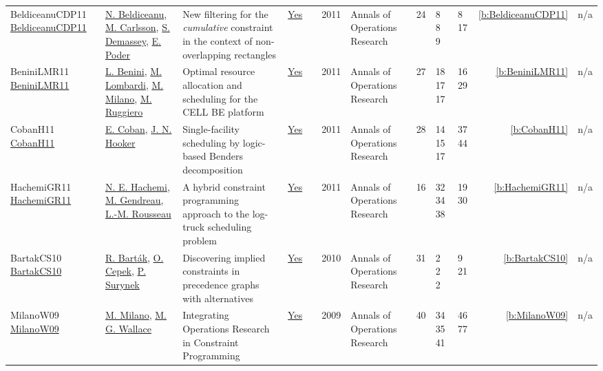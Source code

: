{\begin{longtable}{>{\raggedright\arraybackslash}p{3cm}>{\raggedright\arraybackslash}p{4.5cm}>{\raggedright\arraybackslash}p{6.0cm}rrrp{2.5cm}rp{1cm}p{1cm}rr}
BeldiceanuCDP11 \href{https://doi.org/10.1007/s10479-010-0731-0}{BeldiceanuCDP11} & \hyperref[auth:a128]{N. Beldiceanu}, \hyperref[auth:a91]{M. Carlsson}, \hyperref[auth:a243]{S. Demassey}, \hyperref[auth:a358]{E. Poder} & New filtering for the \emph{cumulative} constraint in the context of non-overlapping rectangles & \href{../works/BeldiceanuCDP11.pdf}{Yes} & \cite{BeldiceanuCDP11} & 2011 & Annals of Operations Research & 24 & 8 8 9 & 8 17 & \ref{b:BeldiceanuCDP11} & n/a\\
BeniniLMR11 \href{https://doi.org/10.1007/s10479-010-0718-x}{BeniniLMR11} & \hyperref[auth:a245]{L. Benini}, \hyperref[auth:a142]{M. Lombardi}, \hyperref[auth:a143]{M. Milano}, \hyperref[auth:a718]{M. Ruggiero} & Optimal resource allocation and scheduling for the {CELL} {BE} platform & \href{../works/BeniniLMR11.pdf}{Yes} & \cite{BeniniLMR11} & 2011 & Annals of Operations Research & 27 & 18 17 17 & 16 29 & \ref{b:BeniniLMR11} & n/a\\
CobanH11 \href{http://dx.doi.org/10.1007/s10479-011-1031-z}{CobanH11} & \hyperref[auth:a335]{E. Coban}, \hyperref[auth:a160]{J. N. Hooker} & \cellcolor{green!10}Single-facility scheduling by logic-based Benders decomposition & \href{../works/CobanH11.pdf}{Yes} & \cite{CobanH11} & 2011 & Annals of Operations Research & 28 & 14 15 17 & 37 44 & \ref{b:CobanH11} & n/a\\
HachemiGR11 \href{https://doi.org/10.1007/s10479-010-0698-x}{HachemiGR11} & \hyperref[auth:a615]{N. E. Hachemi}, \hyperref[auth:a616]{M. Gendreau}, \hyperref[auth:a326]{L.-M. Rousseau} & A hybrid constraint programming approach to the log-truck scheduling problem & \href{../works/HachemiGR11.pdf}{Yes} & \cite{HachemiGR11} & 2011 & Annals of Operations Research & 16 & 32 34 38 & 19 30 & \ref{b:HachemiGR11} & n/a\\
BartakCS10 \href{https://doi.org/10.1007/s10479-008-0492-1}{BartakCS10} & \hyperref[auth:a152]{R. Bart{\'{a}}k}, \hyperref[auth:a161]{O. Cepek}, \hyperref[auth:a780]{P. Surynek} & Discovering implied constraints in precedence graphs with alternatives & \href{../works/BartakCS10.pdf}{Yes} & \cite{BartakCS10} & 2010 & Annals of Operations Research & 31 & 2 2 2 & 9 21 & \ref{b:BartakCS10} & n/a\\
MilanoW09 \href{http://dx.doi.org/10.1007/s10479-009-0654-9}{MilanoW09} & \hyperref[auth:a143]{M. Milano}, \hyperref[auth:a117]{M. G. Wallace} & Integrating Operations Research in Constraint Programming & \href{../works/MilanoW09.pdf}{Yes} & \cite{MilanoW09} & 2009 & Annals of Operations Research & 40 & 34 35 41 & 46 77 & \ref{b:MilanoW09} & n/a\\

\end{longtable}}
